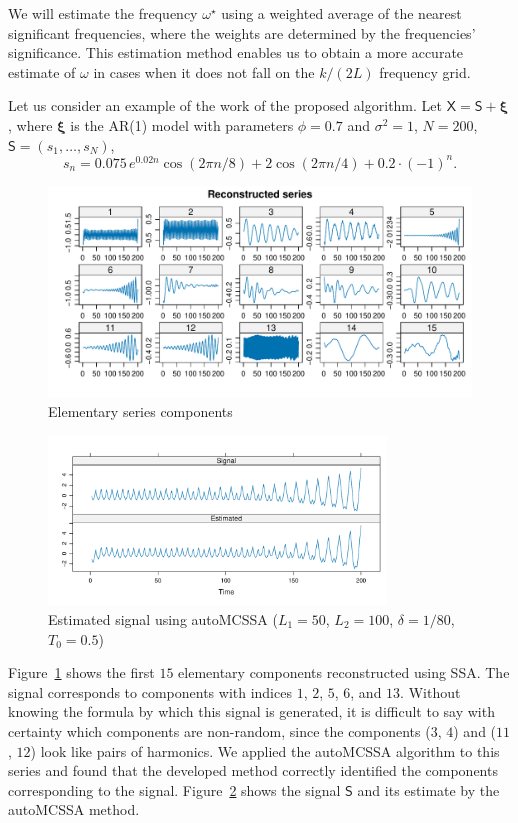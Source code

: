 \documentclass[12pt]{article}
\begin{document}
We will estimate the frequency $\omega^\star$ using a weighted average of the nearest significant frequencies, where the weights are determined by the frequencies' significance.
This estimation method enables us to obtain a more accurate estimate of $\omega$ in cases when it does not fall on the $k/(2L)$ frequency grid.

Let us consider an example of the work of the proposed algorithm. Let $\mathsf{X}=\mathsf{S}+\bm{\xi}$, where $\bm\xi$ is the AR(1) model with parameters $\phi=0.7$ and $\sigma^2=1$, $N=200$, $\mathsf{S}=(s_1,\ldots, s_N)$,
\[
s_n=0.075\, e^{0.02n}\cos(2\pi n/8) + 2\cos(2\pi n / 4) + 0.2\cdot(-1)^n.
\]

\begin{figure}[!h]
    \centering
    \includegraphics[width=\textwidth]{img/reconstructed_ts.pdf}
    \caption{Elementary series components}
    \label{fig:reconstructed_ts}
\end{figure}

\begin{figure}[!h]
    \centering
    \includegraphics[width=0.8\textwidth]{img/auto_mcssa_result.pdf}
    \caption{Estimated signal using autoMCSSA ($L_1=50$, $L_2=100$, $\delta=1/80$, $T_0=0.5$)}
    \label{fig:autoMCSSA_res}
\end{figure}

Figure~\ref{fig:reconstructed_ts} shows the first $15$ elementary components reconstructed using SSA. The signal corresponds to components with indices $1$, $2$, $5$, $6$, and $13$. Without knowing the formula by which this signal is generated, it is difficult to say with certainty which components are non-random, since the components ($3$, $4$) and ($11$, $12$) look like pairs of harmonics. We applied the autoMCSSA algorithm to this series and found that the developed method correctly identified the components corresponding to the signal. Figure~\ref{fig:autoMCSSA_res} shows the signal $\mathsf{S}$ and its estimate by the autoMCSSA method.
\end{document}
